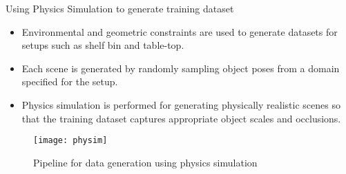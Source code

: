 \begin{columns}[t]
\begin{column}{0.50\textwidth}
\begin{block}{\large Using Physics Simulation to generate training dataset}
		\centering
		    \begin{itemize}
			    \item Environmental and geometric constraints are used to generate datasets for \\setups such as shelf bin and table-top.
			    \item Each scene is generated by randomly sampling object poses from a domain specified for the setup.
			    \item Physics simulation is performed for generating physically realistic scenes so that the training dataset captures appropriate object scales and occlusions.
		    \end{itemize}
		    \vspace{0.2in}
		    \begin{figure}[h]
				\texttt{[image: physim]}
				\caption{Pipeline for data generation using physics simulation}
			\end{figure}
		\end{block}
	\end{column}
\end{columns}	
		    
